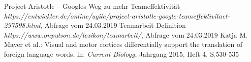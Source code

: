 \documentclass[12pt]{scrartcl}
\begin{document}
\renewcommand{\bibname}{Literaturverzeichnis}
\begin{thebibliography}{1}
   Project Aristotle – Googles Weg zu mehr Teameffektivität {\em https://entwickler.de/online/agile/project-aristotle-google-teameffektivitaet-297598.html}, Abfrage vom 24.03.2019
   Teamarbeit Definition {\em https://www.onpulson.de/lexikon/teamarbeit/}, Abfrage vom 24.03.2019
   Katja M. Mayer et al.: \glqq Visual and motor cortices differentially support the translation of foreign language words\grqq, in: \textit{Current Biology}, Jahrgang 2015, Heft 4, S.530-535
\end{thebibliography}
\end{document}
